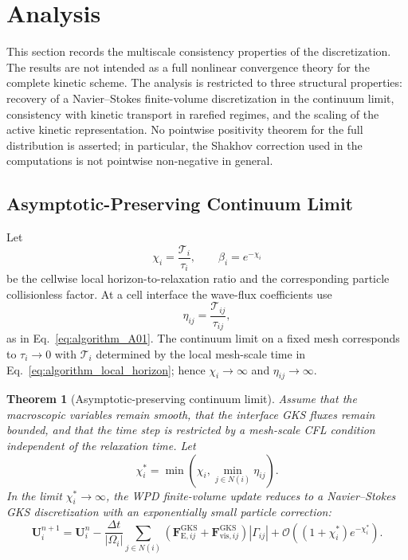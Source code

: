 \documentclass[preprint,12pt]{elsarticle}
\newtheorem{theorem}{Theorem}
\begin{document}
\section{Analysis}\label{sec:analysis}

This section records the multiscale consistency properties of the discretization. The results are not intended as a full nonlinear convergence theory for the complete kinetic scheme. The analysis is restricted to three structural properties: recovery of a Navier--Stokes finite-volume discretization in the continuum limit, consistency with kinetic transport in rarefied regimes, and the scaling of the active kinetic representation. No pointwise positivity theorem for the full distribution is asserted; in particular, the Shakhov correction used in the computations is not pointwise non-negative in general.

\subsection{Asymptotic-Preserving Continuum Limit}

Let
\begin{equation}\label{eq:chi_def}
    \chi_i=\frac{\mathcal{T}_i}{\tau_i},
    \qquad
    \beta_i=e^{-\chi_i}
\end{equation}
be the cellwise local horizon-to-relaxation ratio and the corresponding particle collisionless factor. At a cell interface the wave-flux coefficients use
\begin{equation}\label{eq:eta_interface_analysis}
    \eta_{ij}=\frac{\mathcal{T}_{ij}}{\tau_{ij}},
\end{equation}
as in Eq.~\eqref{eq:algorithm_A01}. The continuum limit on a fixed mesh corresponds to $\tau_i\to0$ with $\mathcal{T}_i$ determined by the local mesh-scale time in Eq.~\eqref{eq:algorithm_local_horizon}; hence $\chi_i\to\infty$ and $\eta_{ij}\to\infty$.

\begin{theorem}[Asymptotic-preserving continuum limit]\label{thm:ap}
Assume that the macroscopic variables remain smooth, that the interface GKS fluxes remain bounded, and that the time step is restricted by a mesh-scale CFL condition independent of the relaxation time. Let
\[
    \chi_i^\ast=\min\left(\chi_i,\min_{j\in N(i)}\eta_{ij}\right).
\]
In the limit $\chi_i^\ast\to\infty$, the WPD finite-volume update reduces to a Navier--Stokes GKS discretization with an exponentially small particle correction:
\begin{equation}\label{eq:ap_limit_update}
    \mathbf U_i^{n+1}
    =
    \mathbf U_i^n
    -
    \frac{\Delta t}{|\Omega_i|}
    \sum_{j\in N(i)}
    \left(
    \mathbf F_{\mathrm E,ij}^{\mathrm{GKS}}
    +
    \mathbf F_{\mathrm{vis},ij}^{\mathrm{GKS}}
    \right)|\Gamma_{ij}|
    +
    \mathcal O\!\left((1+\chi_i^\ast)e^{-\chi_i^\ast}\right) .
\end{equation}
\end{theorem}
\end{document}
